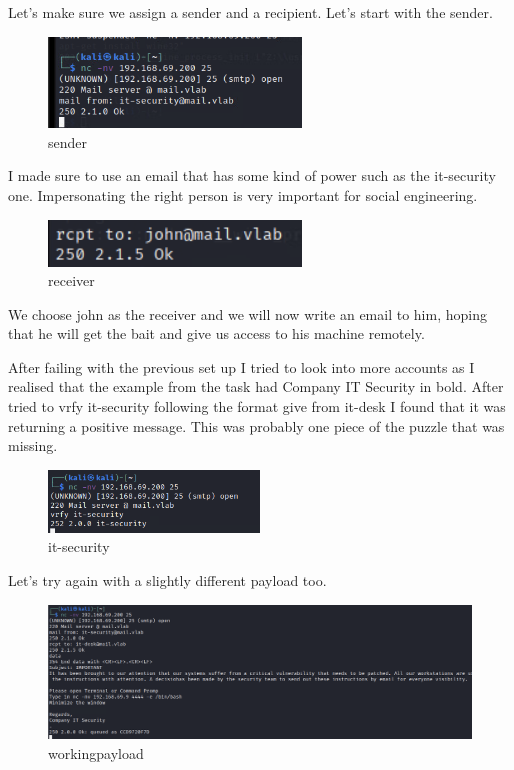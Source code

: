 Let's make sure we assign a sender and a recipient. Let's start with the sender.

\begin{figure}[H]
  \centering
  \includegraphics[width=0.6\textwidth]{figures/sender}
  \caption{sender}
  \label{f:sender}
\end{figure}

I made sure to use an email that has some kind of power such as the it-security
one. Impersonating the right person is very important for social engineering.

\begin{figure}[H]
  \centering
  \includegraphics[width=0.6\textwidth]{figures/receiver}
  \caption{receiver}
  \label{f:receiver}
\end{figure}

We choose john as the receiver and we will now write an email to him, hoping that
he will get the bait and give us access to his machine remotely.

After failing with the previous set up I tried to look into more accounts as I realised
that the example from the task had Company IT Security in bold.
After tried to vrfy it-security following the format give from it-desk I found
that it was returning a positive message. This was probably one piece of the puzzle
that was missing.

\begin{figure}[H]
  \centering
  \includegraphics[width=0.5\textwidth]{figures/it-security}
  \caption{it-security}
  \label{f:it-security}
\end{figure}

Let's try again with a slightly different payload too.

\begin{figure}[H]
  \centering
  \includegraphics[width=1\textwidth]{figures/workingpayload}
  \caption{workingpayload}
  \label{f:workingpayload}
\end{figure}

